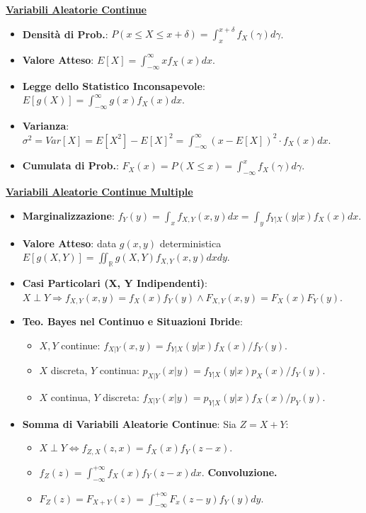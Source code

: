 \documentclass[8pt]{extarticle}
\begin{document}
\begin{multicols*}{3}
    \textbf{\underline{Variabili Aleatorie Continue}}
    \begin{itemize}
        \item \textbf{Densità di Prob.}: $P(x\leq X\leq x+\delta)=\int_{x}^{x+\delta}f_{X}(\gamma)d\gamma$.
        \item \textbf{Valore Atteso}: $E[X]=\int_{-\infty}^{\infty}xf_{X}(x)dx$.
        \item \textbf{Legge dello Statistico Inconsapevole}: $E[g(X)]=\int_{-\infty}^{\infty}g(x)f_{X}(x)dx$.
        \item \textbf{Varianza}: $\sigma^{2}=Var[X]=E[X^{2}]-E[X]^{2}=\int_{-\infty}^{\infty}(x-E[X])^{2}\cdot f_{X}(x)dx$.
        \item \textbf{Cumulata di Prob.}: $F_{X}(x)=P(X\leq x)=\int_{-\infty}^{x}f_{X}(\gamma)d\gamma$.
    \end{itemize}

    \textbf{\underline{Variabili Aleatorie Continue Multiple}}
    \begin{itemize}
        \item \textbf{Marginalizzazione}: $f_{Y}(y)=\int_{x}f_{X,Y}(x,y)dx=\int_{y}f_{Y|X}(y|x)f_{X}(x)dx$.
        \item \textbf{Valore Atteso}: data $g(x,y)$ deterministica $E[g(X,Y)]=\iint_{\mathbb{R}}g(X,Y)f_{X,Y}(x,y)dxdy$.
        \item \textbf{Casi Particolari (X, Y Indipendenti)}: $X\perp Y\Rightarrow f_{X,Y}(x,y)=f_{X}(x)f_{Y}(y)\wedge F_{X,Y}(x,y)=F_{X}(x)F_{Y}(y)$.
        \item \textbf{Teo. Bayes nel Continuo e Situazioni Ibride}:
              \begin{itemize}
                  \item $X,Y$ continue: $f_{X|Y}(x,y)=f_{Y|X}(y|x)f_{X}(x)/f_{Y}(y)$.
                  \item $X$ discreta, $Y$ continua: $p_{X|Y}(x|y)=f_{Y|X}(y|x)p_{X}(x)/f_{Y}(y)$.
                  \item $X$ continua, $Y$ discreta: $f_{X|Y}(x|y)=p_{Y|X}(y|x)f_{X}(x)/p_{Y}(y)$.
              \end{itemize}
        \item \textbf{Somma di Variabili Aleatorie Continue}: Sia $Z=X+Y$:
              \begin{itemize}
                  \item $X\perp Y\Longleftrightarrow f_{Z,X}(z,x)=f_X(x)f_Y(z-x)$.
                  \item $f_Z(z)=\int_{-\infty}^{+\infty}f_X(x)f_Y(z-x)dx$. \textbf{Convoluzione.}
                  \item $F_Z(z)=F_{X+Y}(z)=\int_{-\infty}^{+\infty}F_x(z-y)f_Y(y)dy$.
              \end{itemize}
    \end{itemize}


\end{multicols*}
\end{document}
